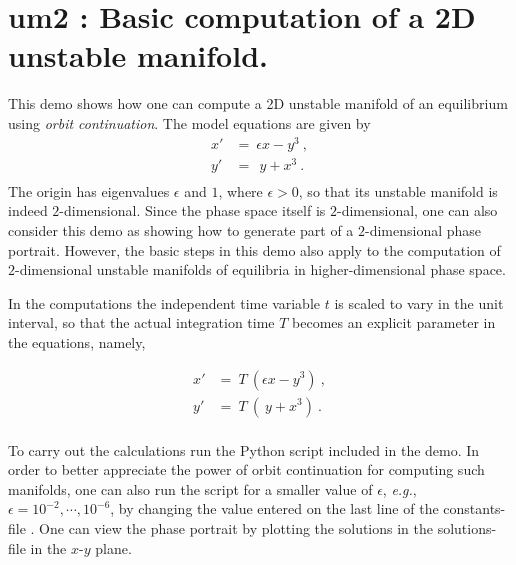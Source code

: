 \documentclass[12pt]{report}
\def\eps{\epsilon}
\begin{document}
%
\section{ um2 : Basic computation of a 2D unstable manifold.} \label{sec:Demos_um2}
This demo shows how one can compute a 2D unstable manifold of an equilibrium
using {\it orbit continuation}.
The model equations are given by
\begin{equation} \begin{array}{cl}
 x' &= ~\eps x - y^3~, \\
 y' &=   ~~y + x^3~. \\
\end{array} \end{equation}
The origin has eigenvalues $\eps$ and $1$, where $\eps>0$, so that its 
unstable manifold is indeed $2$-dimensional. Since the phase space itself 
is $2$-dimensional, one can also consider this demo as showing how to generate 
part of a $2$-dimensional phase portrait. However, the basic steps in this demo 
also apply to the computation of $2$-dimensional unstable manifolds of equilibria 
in higher-dimensional phase space.

In the computations the independent time variable $t$ is scaled to vary in
the unit interval, so that the actual integration time $T$ becomes an 
explicit parameter in the equations, namely,

\begin{equation} \begin{array}{cl}
 x' &= ~T~(\eps x - y^3)~, \\
 y' &=      ~T~(~y + x^3)~. \\
\end{array} \end{equation}

To carry out the calculations run the Python script  included 
in the demo. In order to better appreciate the power of orbit continuation 
for computing such manifolds, one can also run the script for a smaller value 
of $\eps$, {\it e.g.}, $\eps=10^{-2},\cdots,10^{-6}$, by changing the value
entered on the last line of the constants-file . One can view
the phase portrait by plotting the solutions in the solutions-file 
in the $x$-$y$ plane.
\end{document}
